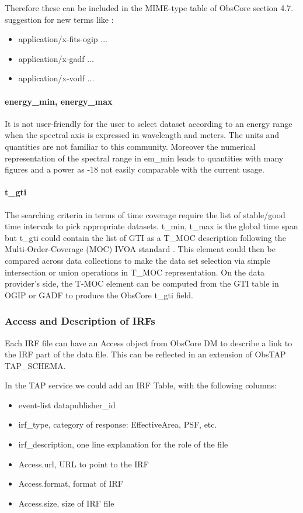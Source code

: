 \documentclass[11pt,a4paper]{ivoa}
\begin{document}
Therefore these can be included in the MIME-type table of ObsCore section 4.7. suggestion for new terms like :
\begin{itemize}
\item application/x-fits-ogip ...
\item application/x-gadf  ...
\item application/x-vodf  ...
\end{itemize}

\paragraph{energy\_min, energy\_max}
It is not user-friendly for the user to select dataset according to an energy range when the spectral axis is expressed in wavelength and meters. The units and quantities are not familiar to this community.
Moreover the numerical representation of the spectral range in em\_min leads to quantities with many figures and a power as -18 not easily comparable with the current usage.

\paragraph{t\_gti}
The searching criteria in terms of time coverage require the list of stable/good time intervals to pick appropriate datasets.
t\_min, t\_max is the global time span but t\_gti could contain the list of \gls{GTI} as a T\_MOC description following the Multi-Order-Coverage (MOC) \gls{IVOA} standard \citep{2022ivoa.spec.0727F}.
This element could then be compared across data collections to make the data set selection via simple intersection or union operations in T\_MOC representation.
On the data provider's side, the T-MOC element can be computed from the \gls{GTI} table in \gls{OGIP} or \gls{GADF} to produce the ObsCore t\_gti field.


\subsubsection{Access and Description of IRFs}

Each \gls{IRF} file can have an Access object from ObsCore DM to describe a link to the \gls{IRF} part of the data file.
This can be reflected in an extension of ObsTAP TAP\_SCHEMA.

In the \gls{TAP} service we could add an \gls{IRF} Table, with the following columns:

\begin{itemize}
    \item event-list datapublisher\_id
    \item irf\_type, category of response: EffectiveArea, \gls{PSF}, etc.
    \item irf\_description, one line explanation for the role of the file
    \item Access.url, URL to point to the \gls{IRF}
    \item Access.format, format of \gls{IRF}
    \item Access.size, size of \gls{IRF} file
\end{itemize}
\end{document}
